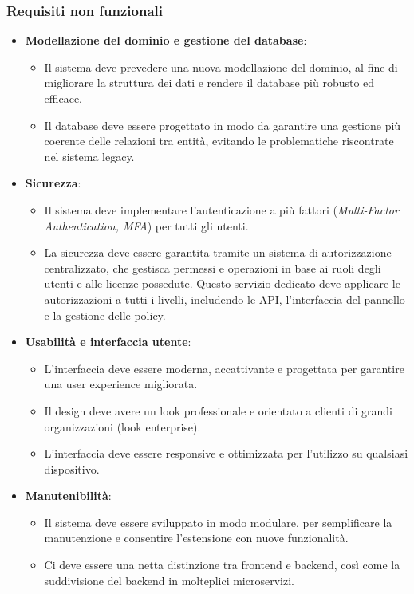 \subsubsection{Requisiti non funzionali}
\begin{itemize}
  \item \textbf{Modellazione del dominio e gestione del database}:
    \begin{itemize}
      \item Il sistema deve prevedere una nuova modellazione del dominio, al fine di migliorare la struttura dei dati e rendere il database più robusto ed efficace.
      \item Il database deve essere progettato in modo da garantire una gestione più coerente delle relazioni tra entità, evitando le problematiche riscontrate nel sistema legacy.
    \end{itemize}

  \item \textbf{Sicurezza}:
    \begin{itemize}
      \item Il sistema deve implementare l’autenticazione a più fattori (\textit{Multi-Factor Authentication, MFA}) per tutti gli utenti.
      \item La sicurezza deve essere garantita tramite un sistema di autorizzazione centralizzato, che gestisca permessi e operazioni in base ai ruoli degli utenti e alle licenze possedute. Questo servizio dedicato deve applicare le autorizzazioni a tutti i livelli, includendo le API, l’interfaccia del pannello e la gestione delle policy.
    \end{itemize}

  \item \textbf{Usabilità e interfaccia utente}:
    \begin{itemize}
      \item L’interfaccia deve essere moderna, accattivante e progettata per garantire una user experience migliorata.
      \item Il design deve avere un look professionale e orientato a clienti di grandi organizzazioni (look enterprise).
      \item L’interfaccia deve essere responsive e ottimizzata per l’utilizzo su qualsiasi dispositivo.
    \end{itemize}

  \item \textbf{Manutenibilità}:
    \begin{itemize}
      \item Il sistema deve essere sviluppato in modo modulare, per semplificare la manutenzione e consentire l’estensione con nuove funzionalità.
      \item Ci deve essere una netta distinzione tra frontend e backend, così come la suddivisione del backend in molteplici microservizi.
    \end{itemize}
\end{itemize}

